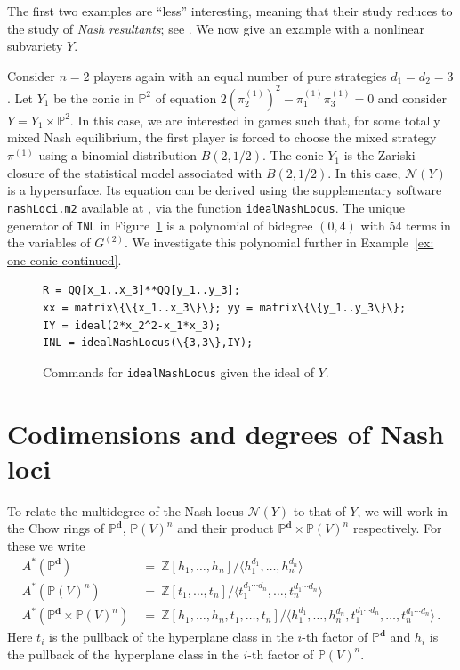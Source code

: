 \documentclass[12pt]{article}
\theoremstyle{definition}
\newenvironment{example}
{\pushQED{\qed}\renewcommand{\qedsymbol}{$\diamond$}\examplex}
{\popQED\endexamplex}
\newcommand{\Z}{{\mathbb Z}}
\newcommand{\PP}{{\mathbb P}}
\def\bd{{\boldsymbol{d}}}
\newcommand{\kn}{{\mathcal N}}
\begin{document}
The first two examples are ``less'' interesting, meaning that their study reduces to the study of {\em Nash resultants}; see \cite[\S 3.4]{abo2026vector}. We now give an example with a nonlinear subvariety $Y$.

\begin{example}\label{ex: one conic}
Consider $n=2$ players again with an equal number of pure strategies $d_1=d_2=3$. Let $Y_1$ be the conic in $\PP^2$ of equation $2(\pi_2^{(1)})^2-\pi_1^{(1)}\pi_3^{(1)}=0$ and consider $Y=Y_1\times\PP^2$. In this case, we are interested in games such that, for some totally mixed Nash equilibrium, the first player is forced to choose the mixed strategy $\pi^{(1)}$ using a binomial distribution $B(2,1/2)$. The conic $Y_1$ is the Zariski closure of the statistical model associated with $B(2,1/2)$. In this case, $\kn(Y)$ is a hypersurface. Its equation can be derived using the supplementary software \texttt{nashLoci.m2} available at \cite{sodomaco2026supplementary}, via the function \texttt{idealNashLocus}. The unique generator of \texttt{INL} in Figure~\ref{fig: idealNashLocus} is a polynomial of bidegree $(0,4)$ with $54$ terms in the variables of $G^{(2)}$. We investigate this polynomial further in Example~\ref{ex: one conic continued}.
\end{example}
\begin{figure}[h]
\centering
\begin{tcolorbox}[size=fbox,width=.6\linewidth,colback=blue!5!white,colframe=blue!75!black]
\begin{Verbatim}[fontsize=\small,commandchars=\\\{\}]
R = QQ[x_1..x_3]**QQ[y_1..y_3];
xx = matrix\{\{x_1..x_3\}\}; yy = matrix\{\{y_1..y_3\}\};
IY = ideal(2*x_2^2-x_1*x_3);
INL = idealNashLocus(\{3,3\},IY);
\end{Verbatim}
\end{tcolorbox}
\caption{Commands for \texttt{idealNashLocus} given the ideal of $Y$.}\label{fig: idealNashLocus}
\end{figure}



\section{Codimensions and degrees of Nash loci}\label{sec: codim degree}
 
To relate the multidegree of the Nash locus $\kn(Y)$ to that of $Y$, we will work in the Chow rings of $\PP^\bd$, $\PP(V)^n$ and their product $\PP^\bd\times \PP(V)^n$ respectively. For these we write
\begin{align*}
    A^*(\PP^\bd)\ &=\ \Z[h_1,\dots,h_n]/\langle h_1^{d_1},\dots,h_n^{d_n}\rangle\\
    A^*(\PP(V)^n)\ &=\ \Z[t_1,\dots,t_n]/\langle t_1^{d_1\cdots d_n},\dots,t_n^{d_1\cdots d_n}\rangle\\
    A^*(\PP^\bd\times \PP(V)^n)\ &=\ \Z[h_1,\ldots,h_n,t_1,\ldots,t_n]/\langle h_1^{d_1},\ldots, h_n^{d_n},t_1^{d_1\cdots d_n},\ldots,t_n^{d_1\cdots d_n}\rangle\,.
\end{align*}
Here $t_i$ is the pullback of the hyperplane class in the $i$-th factor of $\PP^\bd$ and $h_i$ is the pullback of the hyperplane class in the $i$-th factor of $\PP(V)^n$.
\end{document}
